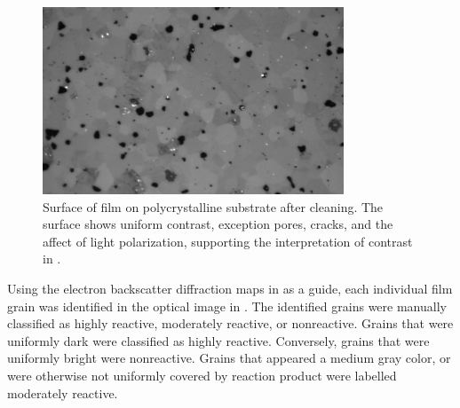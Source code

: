\begin{figure}
\begin{center}
\includegraphics[width=0.8\textwidth]{filmclean.jpg}
\caption[Cleaned film surface]{%
	Surface of  film on polycrystalline  
	substrate after cleaning. The surface shows uniform contrast, exception pores, cracks,
and the affect of light polarization,
	supporting the interpretation of contrast in .}
\label{fig:filmclean}
\end{center}
\end{figure}

Using the electron backscatter diffraction maps in  as a guide,
each individual film grain was identified in the optical image in .
The identified grains were manually classified as highly reactive, moderately reactive, or
nonreactive. Grains that were uniformly dark were classified as highly reactive.
Conversely, grains that were uniformly bright were nonreactive. Grains that appeared a
medium gray color, or were otherwise not uniformly covered by reaction product were
labelled moderately reactive.


